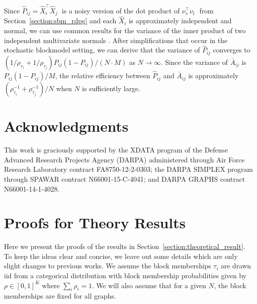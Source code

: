 \documentclass[10pt,letterpaper]{article}
\renewcommand{\hat}{\widehat}
\begin{document}

Since $\hat{P}_{ij} = \hat{X}_i^{\top} \hat{X}_j^{\phantom{\top}}$ is a noisy version of the dot product of $\nu_s^{\top} \nu_t^{\phantom{\top}}$ from Section~\ref{section:sbm_rdpg} and each $\hat{X}_i$ is approximately independent and normal, we can use common results for the variance of the inner product of two independent multivariate normals \citep{brown1977means}.
After simplifications that occur in the stochastic blockmodel setting, we can derive that the variance of $\hat{P}_{ij}$ converges to $\left( 1/\rho_{\tau_i} + 1/\rho_{\tau_j} \right) P_{ij} (1-P_{ij})/(N \cdot M)$ as $N \rightarrow \infty$. 
Since the variance of $\bar{A}_{ij}$ is $P_{ij} (1-P_{ij})/M$, the relative efficiency between $\hat{P}_{ij}$ and $\bar{A}_{ij}$ is approximately $(\rho_{\tau_i}^{-1} + \rho_{\tau_j}^{-1})/N$ when $N$ is sufficiently large.
    

\section*{Acknowledgments}

This work is graciously supported by the XDATA program of the Defense
Advanced Research Projects Agency (DARPA) administered through Air
Force Research Laboratory contract FA8750-12-2-0303; the DARPA SIMPLEX
program through SPAWAR contract N66001-15-C-4041; and DARPA GRAPHS
contract N66001-14-1-4028.

\nolinenumbers






\appendix

\section{Proofs for Theory Results}
Here we present the proofs of the results in Section~\ref{section:theoretical_result}. To keep the ideas clear and concise, we leave out some details which are only slight changes to previous works.
We assume the block memberships $\tau_i$ are drawn iid from a categorical distribution with block membership probabilities given by $\rho\in[0,1]^K$ where $\sum_i \rho_i =1$.
We will also assume that for a given $N$, the block memberships are fixed for all graphs.
\end{document}
